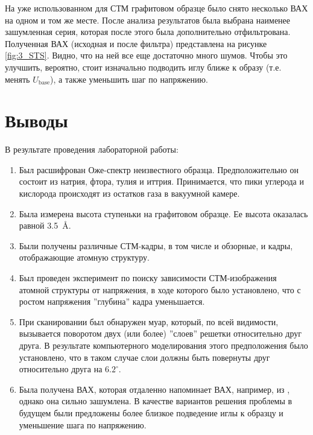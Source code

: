 \documentclass[a4paper, 12pt]{article}
\begin{document}
	На уже использованном для СТМ графитовом образце было снято несколько ВАХ на одном и том же месте. После анализа результатов была выбрана наименее зашумленная серия, которая после этого была дополнительно отфильтрована. Полученная ВАХ (исходная и после фильтра) представлена на рисунке \ref{fig:3_STS}. Видно, что на ней все еще достаточно много шумов. Чтобы это улучшить, вероятно, стоит изначально подводить иглу ближе к образу (т.е. менять $U_{\text{base}}$), а также уменьшить шаг по напряжению.
	
	\section{Выводы}
	
	В результате проведения лабораторной работы:
	
	\begin{enumerate}
		\item Был расшифрован Оже-спектр неизвестного образца. Предположительно он состоит из натрия, фтора, тулия и иттрия. Принимается, что пики углерода и кислорода происходят из остатков газа в вакуумной камере.
		
		\item Была измерена высота ступеньки на графитовом образце. Ее высота оказалась равной 3.5~\AA.
		
		\item Были получены различные СТМ-кадры, в том числе и обзорные, и кадры, отображающие атомную структуру.
		
		\item Был проведен эксперимент по поиску зависимости СТМ-изображения атомной структуры от напряжения, в ходе которого было установлено, что с ростом напряжения ''глубина'' кадра уменьшается.
		
		\item При сканировании был обнаружен муар, который, по всей видимости, вызывается поворотом двух (или более) ''слоев'' решетки относительно друг друга. В результате компьютерного моделирования этого предположения было установлено, что в таком случае слои должны быть повернуты друг относительно друга на $6.2^\circ$.
		
		\item Была получена ВАХ, которая отдаленно напоминает ВАХ, например, из \cite{Article}, однако она сильно зашумлена. В качестве вариантов решения проблемы в будущем были предложены более близкое подведение иглы к образцу и уменьшение шага по напряжению.
	\end{enumerate}
	
\end{document}
